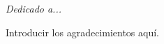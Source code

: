 \begin{flushright}
	\Large\textit{Dedicado a...}
\end{flushright}

\vspace{1.0 cm}

Introducir los agradecimientos aquí.